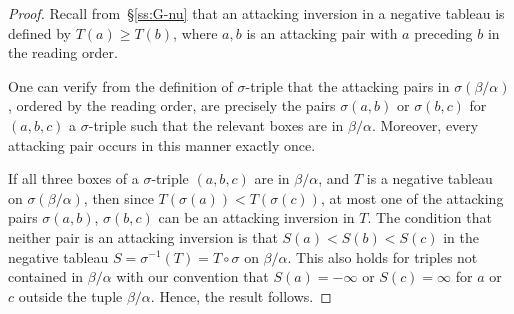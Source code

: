 \documentclass[12pt]{amsart}
\theoremstyle{definition}
\theoremstyle{remark}
\begin{document}
\begin{proof}
Recall from~\S\ref{ss:G-nu} that an attacking inversion in a negative
tableau is defined by $T(a)\geq T(b)$, where $a, b$ is an attacking
pair with $a$ preceding $b$ in the reading order.

One can verify from the definition of $\sigma $-triple that the
attacking pairs in $\sigma (\beta /\alpha )$, ordered by the reading
order, are precisely the pairs $\sigma (a,b)$ or $\sigma (b,c)$ for
$(a,b,c)$ a $\sigma $-triple such that the relevant boxes are in
$\beta /\alpha $.  Moreover, every attacking pair occurs in this manner
exactly once.

If all three boxes of a $\sigma $-triple $(a,b,c)$ are in $\beta
/\alpha $, and $T$ is a negative tableau on $\sigma (\beta /\alpha )$,
then since $T(\sigma (a))<T(\sigma (c))$, at most one of the attacking
pairs $\sigma (a,b)$, $\sigma (b,c)$ can be an attacking inversion in
$T$.  The condition that neither pair is an attacking inversion is
that $S(a)<S(b)<S(c)$ in the negative tableau $S = \sigma ^{-1}(T) =
T\circ \sigma $ on $\beta /\alpha $.  This also holds for triples not
contained in $\beta /\alpha $ with our convention that $S(a) = -\infty
$ or $S(c) = \infty $ for $a$ or $c$ outside the tuple $\beta /\alpha
$.  Hence, the result follows.
\end{proof}
\end{document}
